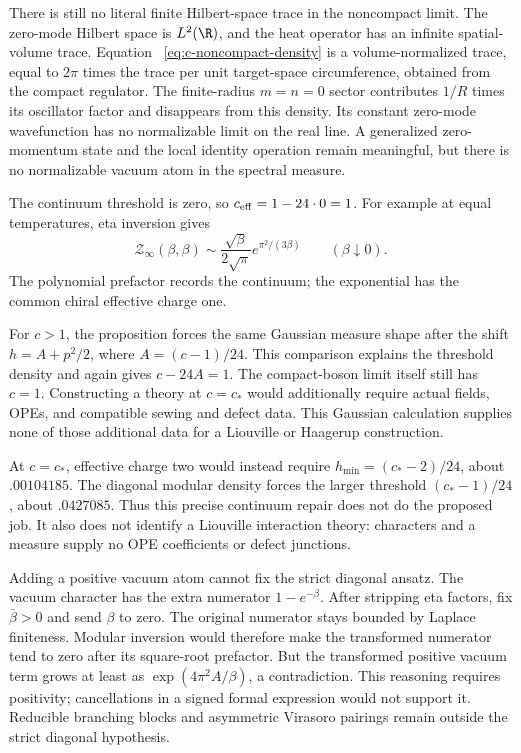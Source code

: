 \begin{example}
There is still no literal finite Hilbert-space trace in the noncompact
limit. The zero-mode Hilbert space is $L^2(\R)$, and the heat operator
has an infinite spatial-volume trace. Equation~
\eqref{eq:c-noncompact-density} is a volume-normalized trace, equal
to $2\pi$ times the trace per unit target-space circumference,
obtained from the compact regulator. The finite-radius
$m=n=0$ sector contributes $1/R$ times its oscillator factor and
disappears from this density. Its constant zero-mode wavefunction has no
normalizable limit on the real line. A generalized zero-momentum
state and the local identity operation remain meaningful, but there
is no normalizable vacuum atom in the spectral measure.

The continuum threshold is zero, so $c_{\rm eff}=1-24\cdot0=1$.
For example at equal temperatures, eta inversion gives
\[
 \mathcal Z_\infty(\beta,\beta)
 \sim\frac{\sqrt\beta}{2\sqrt\pi}
       e^{\pi^2/(3\beta)}\qquad(\beta\downarrow0).
\]
The polynomial prefactor records the continuum; the exponential has
the common chiral effective charge one.

For $c>1$, the proposition forces the same Gaussian measure shape
after the shift $h=A+p^2/2$, where $A=(c-1)/24$. This comparison
explains the threshold density and again gives
$c-24A=1$. The compact-boson limit itself still has $c=1$.
Constructing a theory at $c=c_*$ would additionally require actual
fields, OPEs, and compatible sewing and defect data. This Gaussian
calculation supplies none of those additional data for a Liouville
or Haagerup construction.
\end{example}

At $c=c_*$, effective charge two would instead require
$h_{\min}=(c_*-2)/24$, about $.00104185$. The diagonal modular
density forces the larger threshold $(c_*-1)/24$, about $.0427085$.
Thus this precise continuum repair does not do the proposed job.
It also does not identify a Liouville interaction theory: characters
and a measure supply no OPE coefficients or defect junctions.

Adding a positive vacuum atom cannot fix the strict diagonal ansatz.
The vacuum character has the extra numerator $1-e^{-\beta}$.
After stripping eta factors, fix $\bar\beta>0$ and send
$\beta$ to zero. The original numerator stays bounded by Laplace
finiteness. Modular inversion would therefore make the transformed
numerator tend to zero after its square-root prefactor. But the
transformed positive vacuum term grows at least as
$\exp(4\pi^2A/\beta)$, a contradiction. This reasoning requires
positivity; cancellations in a signed formal expression would not
support it. Reducible branching blocks and asymmetric Virasoro
pairings remain outside the strict diagonal hypothesis.

